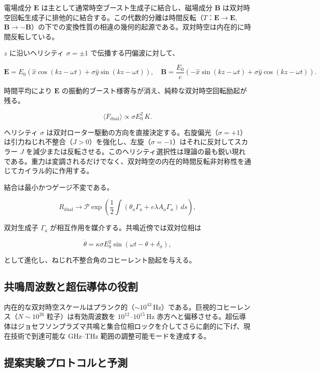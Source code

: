 \documentclass[a4paper]{article}
\begin{document}
電場成分 $\mathbf{E}$ は主として通常時空ブースト生成子に結合し、磁場成分 $\mathbf{B}$ は双対時空回転生成子に排他的に結合する。この代数的分離は時間反転（$T$：$\mathbf{E} \to \mathbf{E}$, $\mathbf{B} \to -\mathbf{B}$）の下での変換性質の相違の幾何的起源である。双対時空は内在的に時間反転している。

$z$ に沿いヘリシティ $\sigma = \pm 1$ で伝播する円偏波に対して、

\[
\mathbf{E} = E_0 (\hat{x} \cos(kz - \omega t) + \sigma \hat{y} \sin(kz - \omega t)), \quad \mathbf{B} = \frac{E_0}{c} (-\hat{x} \sin(kz - \omega t) + \sigma \hat{y} \cos(kz - \omega t)).
\]

時間平均により $\mathbf{E}$ の振動的ブースト様寄与が消え、純粋な双対時空回転励起が残る。

\[
\langle F_{\text{dual}} \rangle \propto \sigma E_0^2 \, K.
\]

ヘリシティ $\sigma$ は双対ローター駆動の方向を直接決定する。右旋偏光（$\sigma = +1$）は引力ねじれ不整合（$J > 0$）を強化し、左旋（$\sigma = -1$）はそれに反対してスカラー $J$ を減少または反転させる。このヘリシティ選択性は理論の最も鋭い現れである。重力は変調されるだけでなく、双対時空の内在的時間反転非対称性を通じてカイラル的に作用する。

結合は最小かつゲージ不変である。

\[
R_{\text{dual}} \to \mathcal{P} \exp\!\left( \frac{1}{2} \int (\theta_a \Gamma_a + e \lambda A_a \Gamma_a) \, ds \right),
\]

双対生成子 $\Gamma_a$ が相互作用を媒介する。共鳴近傍では双対位相は

\[
\dot{\theta} = \kappa \sigma E_0^2 \sin(\omega t - \theta + \delta_\sigma),
\]

として進化し、ねじれ不整合角のコヒーレント励起を与える。

\subsection{共鳴周波数と超伝導体の役割}

内在的な双対時空スケールはプランク的（$\sim 10^{43}$\,Hz）である。巨視的コヒーレンス（$N \sim 10^{26}$ 粒子）は有効周波数を $10^{12}$--$10^{15}$\,Hz 赤方へと偏移させる。超伝導体はジョセフソンプラズマ共鳴と集合位相ロックを介してさらに劇的に下げ、現在技術で到達可能な GHz--THz 範囲の調整可能モードを達成する。

\subsection{提案実験プロトコルと予測}
\end{document}
